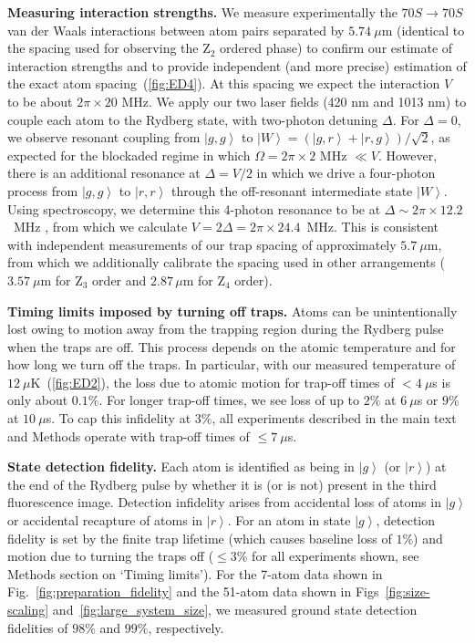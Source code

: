 \documentclass[prl,nobalancelastpage,twocolumn,superscriptaddress,nofootinbib]{revtex4}
\newcommand{\ket}[1]{\left|#1\right\rangle}
\begin{document}
\begin{footnotesize}
\noindent
\textbf{Measuring interaction strengths.} We measure experimentally the $70S
\rightarrow 70S$ van der Waals interactions between atom pairs separated by
$5.74~\mu$m (identical to the spacing used for observing the Z$_2$ ordered
phase) to confirm our estimate of interaction strengths and to provide
independent (and more precise) estimation of the exact atom
spacing~(\ref{fig:ED4}). At this spacing we expect the interaction $V$ to be 
about $2\pi \times 20$ MHz. We apply our two laser fields (420 nm and
1013 nm) to couple each atom to the Rydberg state, with two-photon detuning
$\Delta$. For $\Delta=0$, we observe resonant coupling from $\ket{g,g}$ to
$\ket{W} = (\ket{g,r} + \ket{r,g})/\sqrt{2}$, as expected for the
blockaded regime in which $\Omega = 2\pi \times 2$ MHz  $\ll V$. However, there
is an additional resonance at $\Delta = V/2$ in which we drive a four-photon
process from $\ket{g,g}$ to $\ket{r,r}$ through the off-resonant intermediate
state $\ket{W}$. Using spectroscopy, we determine this 4-photon resonance to be at
$\Delta \sim 2\pi \times 12.2$~MHz , from which we calculate $V = 2\Delta =
2\pi \times 24.4$~MHz. This is consistent with independent measurements of our
trap spacing of approximately $5.7~\mu$m, from which we additionally calibrate the
spacing used in other arrangements ($3.57~\mu$m for Z$_3$ order and
$2.87\,\mu$m for Z$_4$ order).

\noindent
\textbf{Timing limits imposed by turning off traps.} Atoms can be
unintentionally lost owing to motion away from the trapping region during the
Rydberg pulse when the traps are off. This process depends on the atomic
temperature and for how long we turn off the traps. In particular, with our
measured temperature of $12~\mu$K~(\ref{fig:ED2}), the loss due to atomic
motion for trap-off times of $< 4~\mu$s is only about $0.1\%$. For longer
trap-off times, we see loss of up to $2\%$ at $6~\mu$s or $9\%$ at $10~\mu$s.
To cap this infidelity at $3\%$, all experiments described in the main text and
Methods operate with trap-off times of $\le 7~\mu$s.

\noindent
\textbf{State detection fidelity.}
Each atom is identified as being in $\ket{g}$ (or $\ket{r}$) at the end of the
Rydberg pulse by whether it is (or is not) present in the third fluorescence
image. Detection infidelity arises from accidental loss of atoms in $\ket{g}$
or accidental recapture of atoms in $\ket{r}$. For an atom in state $\ket{g}$,
detection fidelity is set by the finite trap lifetime (which causes baseline
loss of $1\%$) and motion due to turning the traps off ($\le 3\%$ for all
experiments shown, see Methods section on `Timing limits'). For
the 7-atom data shown in Fig.~\ref{fig:preparation_fidelity} and the 51-atom data shown
in Figs~\ref{fig:size-scaling} and~\ref{fig:large_system_size}, we measured ground state detection fidelities of $98\%$ and
$99\%$, respectively.


\end{footnotesize}
\end{document}
